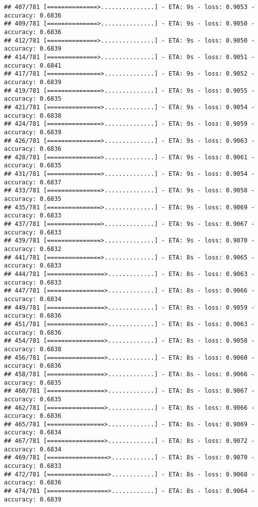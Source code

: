 \documentclass[
]{article}
\begin{document}
\begin{verbatim}
## 407/781 [==============>...............] - ETA: 9s - loss: 0.9053 - accuracy: 0.6836
## 409/781 [==============>...............] - ETA: 9s - loss: 0.9050 - accuracy: 0.6836
## 412/781 [==============>...............] - ETA: 9s - loss: 0.9050 - accuracy: 0.6839
## 414/781 [==============>...............] - ETA: 9s - loss: 0.9051 - accuracy: 0.6841
## 417/781 [===============>..............] - ETA: 9s - loss: 0.9052 - accuracy: 0.6839
## 419/781 [===============>..............] - ETA: 9s - loss: 0.9055 - accuracy: 0.6835
## 421/781 [===============>..............] - ETA: 9s - loss: 0.9054 - accuracy: 0.6838
## 424/781 [===============>..............] - ETA: 9s - loss: 0.9059 - accuracy: 0.6839
## 426/781 [===============>..............] - ETA: 9s - loss: 0.9063 - accuracy: 0.6836
## 428/781 [===============>..............] - ETA: 9s - loss: 0.9061 - accuracy: 0.6835
## 431/781 [===============>..............] - ETA: 9s - loss: 0.9054 - accuracy: 0.6837
## 433/781 [===============>..............] - ETA: 9s - loss: 0.9058 - accuracy: 0.6835
## 435/781 [===============>..............] - ETA: 9s - loss: 0.9069 - accuracy: 0.6833
## 437/781 [===============>..............] - ETA: 9s - loss: 0.9067 - accuracy: 0.6833
## 439/781 [===============>..............] - ETA: 9s - loss: 0.9070 - accuracy: 0.6832
## 441/781 [===============>..............] - ETA: 8s - loss: 0.9065 - accuracy: 0.6833
## 444/781 [================>.............] - ETA: 8s - loss: 0.9063 - accuracy: 0.6833
## 447/781 [================>.............] - ETA: 8s - loss: 0.9066 - accuracy: 0.6834
## 449/781 [================>.............] - ETA: 8s - loss: 0.9059 - accuracy: 0.6836
## 451/781 [================>.............] - ETA: 8s - loss: 0.9063 - accuracy: 0.6836
## 454/781 [================>.............] - ETA: 8s - loss: 0.9058 - accuracy: 0.6838
## 456/781 [================>.............] - ETA: 8s - loss: 0.9060 - accuracy: 0.6836
## 458/781 [================>.............] - ETA: 8s - loss: 0.9066 - accuracy: 0.6835
## 460/781 [================>.............] - ETA: 8s - loss: 0.9067 - accuracy: 0.6835
## 462/781 [================>.............] - ETA: 8s - loss: 0.9066 - accuracy: 0.6836
## 465/781 [================>.............] - ETA: 8s - loss: 0.9069 - accuracy: 0.6834
## 467/781 [================>.............] - ETA: 8s - loss: 0.9072 - accuracy: 0.6834
## 469/781 [=================>............] - ETA: 8s - loss: 0.9070 - accuracy: 0.6833
## 472/781 [=================>............] - ETA: 8s - loss: 0.9068 - accuracy: 0.6836
## 474/781 [=================>............] - ETA: 8s - loss: 0.9064 - accuracy: 0.6839

\end{verbatim}
\end{document}
